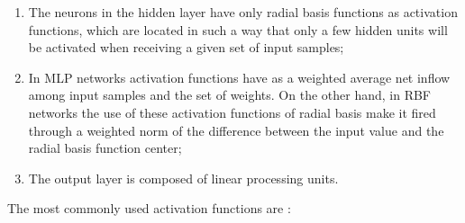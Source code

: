 \begin{enumerate}
\item The neurons in the hidden layer have only radial basis functions as activation functions, which are located in such a way that only a few hidden units will be activated when receiving a given set of input samples;
\item In MLP networks activation functions have as a weighted average net inflow among input samples and the set of weights.  On the other hand, in RBF networks the use of these activation functions of radial basis make it fired through a weighted norm of the difference between the input value and the radial basis function center;
\item The output layer is composed of linear processing units.
\end{enumerate}

The most commonly used activation functions are \cite{valenca2005aplicando} \cite{engelbrecht2007computational}:

